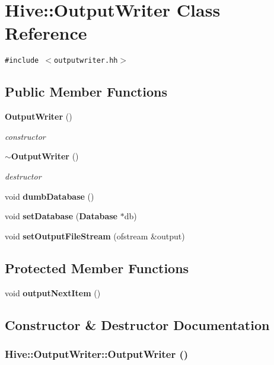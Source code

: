 \section{Hive::OutputWriter Class Reference}
\label{classHive_1_1OutputWriter}
{\tt \#include $<$outputwriter.hh$>$}

\subsection*{Public Member Functions}
\begin{CompactItemize}
\item 
{\bf OutputWriter} ()
\begin{CompactList}\small\item\em constructor \item\end{CompactList}\item 
{\bf $\sim$OutputWriter} ()
\begin{CompactList}\small\item\em destructor \item\end{CompactList}\item 
void {\bf dumbDatabase} ()
\item 
void {\bf setDatabase} ({\bf Database} $\ast$db)
\item 
void {\bf setOutputFileStream} (ofstream \&output)
\end{CompactItemize}
\subsection*{Protected Member Functions}
\begin{CompactItemize}
\item 
void {\bf outputNextItem} ()
\end{CompactItemize}


\subsection{Constructor \& Destructor Documentation}
\subsubsection[OutputWriter]{\setlength{\rightskip}{0pt plus 5cm}Hive::OutputWriter::OutputWriter ()}\label{classHive_1_1OutputWriter_abf751a6ebd05751a4a3b19e994eb265}


